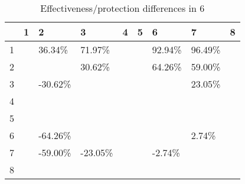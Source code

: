 \begin{table}[ht]
\centering
\begin{tabular}{rllllllll}
  \hline
 & 1 & 2 & 3 & 4 & 5 & 6 & 7 & 8 \\ 
  \hline
1 &  & 36.34\% & 71.97\% &  &  & 92.94\% & 96.49\% &  \\ 
  2 &  &  & 30.62\% &  &  & 64.26\% & 59.00\% &  \\ 
  3 &  & -30.62\% &  &  &  &  & 23.05\% &  \\ 
  4 &  &  &  &  &  &  &  &  \\ 
  5 &  &  &  &  &  &  &  &  \\ 
  6 &  & -64.26\% &  &  &  &  & 2.74\% &  \\ 
  7 &  & -59.00\% & -23.05\% &  &  & -2.74\% &  &  \\ 
  8 &  &  &  &  &  &  &  &  \\ 
   \hline
\end{tabular}
\caption{Effectiveness/protection differences in  6} 
\end{table}
